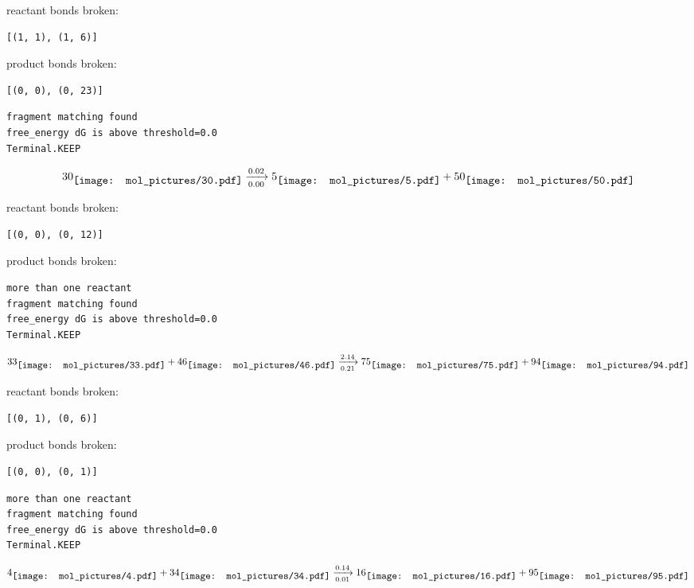 \documentclass{article}
\begin{document}
reactant bonds broken:\begin{verbatim}
[(1, 1), (1, 6)]
\end{verbatim}
product bonds broken:\begin{verbatim}
[(0, 0), (0, 23)]
\end{verbatim}




\vspace{1cm}
\begin{verbatim}
fragment matching found
free_energy dG is above threshold=0.0
Terminal.KEEP
\end{verbatim}
$$
30
\raisebox{-.5\height}{\texttt{[image: mol\_pictures/30.pdf]}}
\xrightarrow[0.00]{0.02}
5
\raisebox{-.5\height}{\texttt{[image: mol\_pictures/5.pdf]}}
+
50
\raisebox{-.5\height}{\texttt{[image: mol\_pictures/50.pdf]}}
$$


reactant bonds broken:\begin{verbatim}
[(0, 0), (0, 12)]
\end{verbatim}
product bonds broken:



\vspace{1cm}
\begin{verbatim}
more than one reactant
fragment matching found
free_energy dG is above threshold=0.0
Terminal.KEEP
\end{verbatim}
$$
33
\raisebox{-.5\height}{\texttt{[image: mol\_pictures/33.pdf]}}
+
46
\raisebox{-.5\height}{\texttt{[image: mol\_pictures/46.pdf]}}
\xrightarrow[0.21]{2.14}
75
\raisebox{-.5\height}{\texttt{[image: mol\_pictures/75.pdf]}}
+
94
\raisebox{-.5\height}{\texttt{[image: mol\_pictures/94.pdf]}}
$$


reactant bonds broken:\begin{verbatim}
[(0, 1), (0, 6)]
\end{verbatim}
product bonds broken:\begin{verbatim}
[(0, 0), (0, 1)]
\end{verbatim}




\vspace{1cm}
\begin{verbatim}
more than one reactant
fragment matching found
free_energy dG is above threshold=0.0
Terminal.KEEP
\end{verbatim}
$$
4
\raisebox{-.5\height}{\texttt{[image: mol\_pictures/4.pdf]}}
+
34
\raisebox{-.5\height}{\texttt{[image: mol\_pictures/34.pdf]}}
\xrightarrow[0.01]{0.14}
16
\raisebox{-.5\height}{\texttt{[image: mol\_pictures/16.pdf]}}
+
95
\raisebox{-.5\height}{\texttt{[image: mol\_pictures/95.pdf]}}
$$
\end{document}
